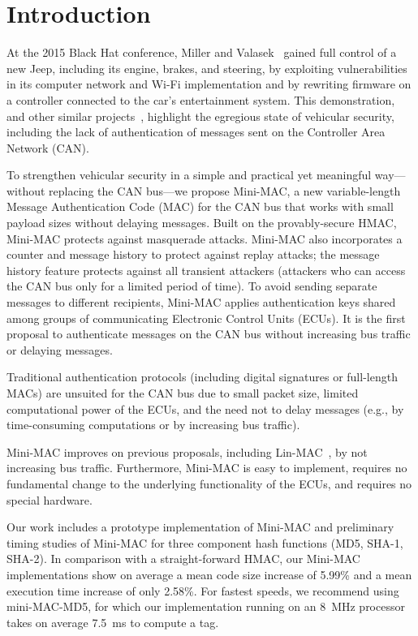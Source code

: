 \section{Introduction}
\label{intro}

At the 2015 Black Hat conference, Miller and Valasek~\cite{blackhat} gained full control of a new Jeep,
including its engine, brakes, and steering, by exploiting vulnerabilities in its
computer network and Wi-Fi implementation and by rewriting firmware on a controller connected to the car's entertainment system.
This demonstration, and other similar 
projects~\cite{Rouf2010,Koscher-2010,Checkoway-2011,Woo-14,C2X}, 
highlight the egregious state of vehicular security, including the lack of 
authentication of messages sent on the Controller Area Network (CAN).   

To strengthen vehicular security in a simple and practical 
yet meaningful way---without replacing the CAN bus---we propose Mini-MAC, 
a new variable-length Message Authentication Code (MAC)
for the CAN bus that works with small payload sizes without delaying messages.  
Built on the provably-secure HMAC, Mini-MAC protects against masquerade attacks.  
Mini-MAC also incorporates a counter and message history to protect against replay attacks;
the message history feature protects against all transient attackers (attackers
who can access the CAN bus only for a limited period of time).
To avoid sending separate messages to different recipients, Mini-MAC applies authentication keys
shared among groups of communicating Electronic Control Units (ECUs).
It is the first proposal to authenticate messages on the CAN bus without increasing bus traffic
or delaying messages. 

Traditional authentication protocols (including digital signatures or full-length MACs) are unsuited for the CAN bus due to
small packet size, limited computational power of the ECUs,
and the need not to delay messages (e.g., by time-consuming computations or by
increasing bus traffic).   

Mini-MAC improves on previous proposals, including Lin-MAC~\cite{Lin-MAC}, by not increasing bus traffic.
Furthermore, Mini-MAC is easy to implement,
requires no fundamental change to the underlying functionality of the ECUs, and 
requires no special hardware.

Our work includes a prototype implementation of Mini-MAC and preliminary timing studies 
of Mini-MAC for three component hash functions (MD5, SHA-1, SHA-2).  
In comparison with a straight-forward HMAC, our Mini-MAC implementations show on average
a mean code size increase of 5.99\% and 
a mean execution time increase of only 2.58\%.
For fastest speeds, we recommend using mini-MAC-MD5, for which our implementation 
running on an 8~MHz processor takes on average 7.5~ms to compute a tag.

